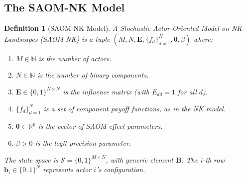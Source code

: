 \documentclass[12pt]{article}
\newtheorem{definition}{Definition}
\newcommand{\R}{\mathbb{R}}
\newcommand{\N}{\mathbb{N}}
\newcommand{\bb}{\mathbf{b}}
\newcommand{\bB}{\mathbf{B}}
\newcommand{\bE}{\mathbf{E}}
\newcommand{\btheta}{\boldsymbol{\theta}}
\begin{document}
\subsection{The SAOM-NK Model}
\label{sec:saomnk_model}

\begin{definition}[SAOM-NK Model]
\label{def:saomnk}
A \emph{Stochastic Actor-Oriented Model on NK Landscapes} (SAOM-NK) is a tuple
$(M, N, \bE, \{f_d\}_{d=1}^N, \btheta, \beta)$ where:
\begin{enumerate}[label=(\roman*)]
  \item $M \in \N$ is the number of actors.
  \item $N \in \N$ is the number of binary components.
  \item $\bE \in \{0,1\}^{N \times N}$ is the influence matrix (with
        $E_{dd}=1$ for all $d$).
  \item $\{f_d\}_{d=1}^N$ is a set of component payoff functions, as in the NK
        model.
  \item $\btheta \in \R^p$ is the vector of SAOM effect parameters.
  \item $\beta > 0$ is the logit precision parameter.
\end{enumerate}
The state space is $\mathcal{S} = \{0,1\}^{M \times N}$, with generic element
$\bB$. The $i$-th row $\bb_i \in \{0,1\}^N$ represents actor $i$'s
configuration.
\end{definition}
\end{document}

